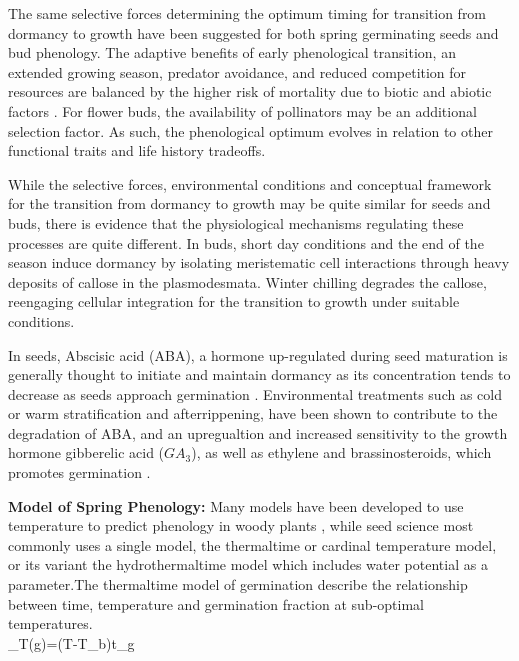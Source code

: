 \documentclass{article}\usepackage[]{graphicx}\usepackage[]{color}
\begin{document}
\par The same selective forces determining the optimum timing for transition from dormancy to growth have been suggested for both spring germinating seeds and bud phenology. The adaptive benefits of early phenological transition, an extended growing season, predator avoidance, and reduced competition for resources are balanced by the higher risk of mortality due to biotic and abiotic factors \citep{Rathcke1985}. For flower buds, the availability of pollinators may be an additional selection factor. As such, the phenological optimum evolves in relation to other functional traits and life history tradeoffs. 
\par While the selective forces, environmental conditions and conceptual framework for the transition from dormancy to growth may be quite similar for seeds and buds, there is evidence that the physiological mechanisms regulating these processes are quite different. In buds, short day conditions and the end of the season induce dormancy by isolating meristematic cell interactions through heavy deposits of callose in the plasmodesmata\citep{Rinne2011,Sager2014}. Winter chilling degrades the callose, reengaging cellular integration for the transition to growth under suitable conditions. 
\par In seeds, Abscisic acid (ABA), a hormone up-regulated during seed maturation is generally thought to initiate and maintain dormancy as its concentration tends to decrease as seeds approach germination \citep{Baskin2014, Fenner2000}. Environmental treatments such as cold or warm stratification and afterrippening, have been shown to contribute to the degradation of ABA, and an upregualtion and increased sensitivity to the growth hormone gibberelic acid ($GA_3$), as well as ethylene and brassinosteroids, which promotes germination \citep{Kucera2005}.

\textbf{Model of Spring Phenology:} Many models have been developed to use temperature to predict phenology in woody plants \citep{Chuine2002}, while seed science most commonly uses a single model, the thermaltime or cardinal temperature model, or its variant the hydrothermaltime model which includes water potential as a parameter\citep {Bradford2002}.The thermaltime model of germination describe the relationship between time, temperature and germination fraction at sub-optimal temperatures.\\

\theta_{T}(g)=(T-T_{b})t_{g}\\
\end{document}
